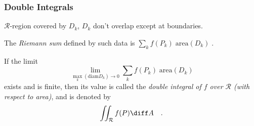 \begin{frame}\frametitle{Double Integrals}
$\mathcal R$-region covered by $D_k$, $D_k$ don't overlap except at boundaries.
\begin{definition}
The \emph{Riemann sum} defined by such data is
$
\displaystyle\sum\limits_k f(P_k) \; \text{area}(D_k)\; .
$
\end{definition}

\begin{definition}

If the limit
\[
\lim\limits_{\max_k(\text{diam} D_k) \to 0} \sum_k f(P_k) \; \text{area}(D_k)
\]
exists and is finite, then its value is called the \emph{double integral of $f$ over $\mathcal{R}$ (with respect to area)}, and is denoted by
\[
\iint_{\mathcal{R}} f(P) \diff A\quad  .
\]
\end{definition}

\end{frame}